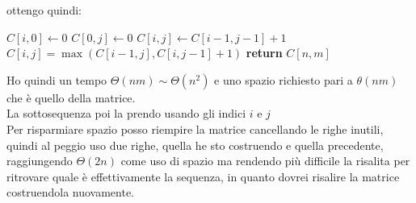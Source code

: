 \documentclass[a4paper,12pt, oneside]{book}
\begin{document}
ottengo quindi:
\begin{shaded}
  \begin{algorithmic}
    \State $C[i,0]\gets 0$
    \EndFor
    \State $C[0,j]\gets 0$
    \EndFor
    \State $C[i,j]\gets C[i-1,j-1]+1$
    \Else
    \State $C[i, j]=\max(C[i-1, j], C[i, j-1]+1)$
    \EndIf
    \EndFor
    \EndFor
    \State \textbf{return} $C[n,m]$
    \EndFunction
  \end{algorithmic}
\end{shaded}
Ho quindi un tempo $\Theta(nm)\sim \Theta(n^2)$ e uno spazio richiesto
pari a $\theta(nm)$ che è quello della matrice.\\
La sottosequenza poi la prendo usando gli indici $i$ e $j$\\
Per risparmiare spazio posso riempire la matrice cancellando le righe
inutili, quindi al peggio uso due righe, quella he sto costruendo e
quella precedente, raggiungendo $\Theta(2n)$ come uso di spazio ma
rendendo più difficile la risalita per ritrovare quale è
effettivamente la sequenza, in quanto dovrei risalire la matrice
costruendola nuovamente.
\newpage
\end{document}
